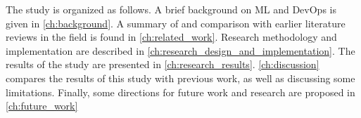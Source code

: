 The study is organized as follows.
A brief background on ML and DevOps is given in \cref{ch:background}.
A summary of and comparison with earlier literature reviews in the field is found in \cref{ch:related_work}.
Research methodology and implementation are described in \cref{ch:research_design_and_implementation}.
The results of the study are presented in \cref{ch:research_results}.
\cref{ch:discussion} compares the results of this study with previous work, as well as discussing some limitations.
Finally, some directions for future work and research are proposed in \cref{ch:future_work}
